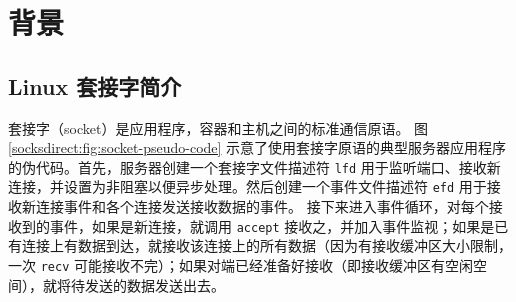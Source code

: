 \section{背景}
\label{socksdirect:sec:background}


\subsection{Linux 套接字简介}






套接字（socket）是应用程序，容器和主机之间的标准通信原语。
图 \ref{socksdirect:fig:socket-pseudo-code} 示意了使用套接字原语的典型服务器应用程序的伪代码。首先，服务器创建一个套接字文件描述符 \texttt{lfd} 用于监听端口、接收新连接，并设置为非阻塞以便异步处理。然后创建一个事件文件描述符 \texttt{efd} 用于接收新连接事件和各个连接发送接收数据的事件。
接下来进入事件循环，对每个接收到的事件，如果是新连接，就调用 \texttt{accept} 接收之，并加入事件监视；如果是已有连接上有数据到达，就接收该连接上的所有数据（因为有接收缓冲区大小限制，一次 \texttt{recv} 可能接收不完）；如果对端已经准备好接收（即接收缓冲区有空闲空间），就将待发送的数据发送出去。

